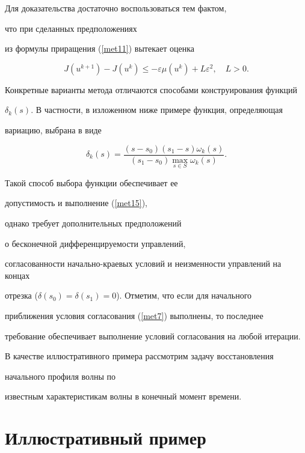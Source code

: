 Для доказательства достаточно воспользоваться тем фактом, 


что при сделанных предположениях


из формулы приращения (\ref{met11}) вытекает оценка


$$


J(u^{k+1})-J(u^k)\leq -\varepsilon\mu(u^k)+L\varepsilon^2,\quad L>0.


$$





Конкретные варианты метода отличаются способами конструирования функций


$\delta_k(s)$. В частности, в изложенном ниже примере функция, определяющая


вариацию, выбрана в виде


$$


\delta_k(s)=\frac{(s-s_0)(s_1-s)\omega_k(s)}{(s_1-s_0)


\max\limits_{s\in S}\omega_k(s)}.


$$





Такой способ выбора функции обеспечивает ее 


допустимость и выполнение (\ref{met15}),


однако требует дополнительных предположений 


о бесконечной дифференцируемости управлений,


согласованности начально-краевых условий и неизменности управлений на концах


отрезка ($\delta(s_0)=\delta(s_1)=0$). Отметим, что если для начального 


приближения условия согласования (\ref{met7}) выполнены, то последнее 


требование обеспечивает выполнение условий согласования на любой итерации.





В качестве иллюстративного примера рассмотрим задачу восстановления 


начального профиля волны по 


известным характеристикам волны в конечный момент времени. 





\section{Иллюстративный пример}





